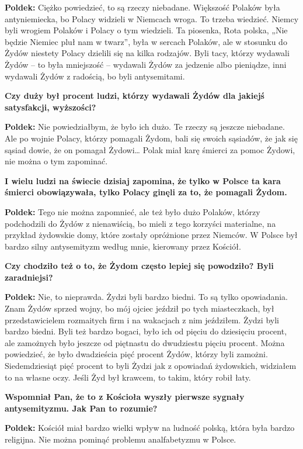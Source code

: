 \begin{otherlanguage}{polish}
\textbf{Poldek:}  Ciężko powiedzieć, to są rzeczy niebadane. Większość Polaków była antyniemiecka, bo Polacy widzieli w Niemcach wroga. To trzeba wiedzieć. Niemcy byli wrogiem Polaków i Polacy o tym wiedzieli. Ta piosenka, Rota polska, „Nie będzie Niemiec pluł nam w twarz”, była w sercach Polaków, ale w stosunku do Żydów niestety Polacy dzielili się na kilka rodzajów. Byli tacy, którzy wydawali Żydów – to była mniejszość – wydawali Żydów za jedzenie albo pieniądze, inni wydawali Żydów z radością, bo byli antysemitami.

\textbf{Czy duży był procent ludzi, którzy wydawali Żydów dla jakiejś satysfakcji, wyższości?}
 
\textbf{Poldek:} Nie powiedziałbym, że było ich dużo. Te rzeczy są jeszcze niebadane. Ale po wojnie Polacy, którzy pomagali Żydom, bali się swoich sąsiadów, że jak się sąsiad dowie, że on pomagał Żydowi… Polak miał karę śmierci za pomoc Żydowi, nie można o tym zapominać.

\textbf{I wielu ludzi na świecie dzisiaj zapomina, że tylko w Polsce ta kara śmierci obowiązywała, tylko Polacy ginęli za to, że pomagali Żydom.}

\textbf{Poldek:} Tego nie można zapomnieć, ale też było dużo Polaków, którzy podchodzili do Żydów z nienawiścią, bo mieli z tego korzyści materialne, na przykład żydowskie domy, które zostały opróżnione przez Niemców. W Polsce był bardzo silny antysemityzm według mnie, kierowany przez Kościół.
   
\textbf{Czy chodziło też o to, że Żydom często lepiej się powodziło? Byli zaradniejsi?}

\textbf{Poldek:} Nie, to nieprawda. Żydzi byli bardzo biedni. To są tylko opowiadania. Znam Żydów sprzed wojny, bo mój ojciec jeździł po tych miasteczkach, był przedstawicielem rozmaitych firm i na wakacjach z nim jeździłem. Żydzi byli bardzo biedni. Byli też bardzo bogaci, było ich od pięciu do dziesięciu procent, ale zamożnych było jeszcze od piętnastu do dwudziestu pięciu procent. Można powiedzieć, że było dwadzieścia pięć procent Żydów, którzy byli zamożni. Siedemdziesiąt pięć procent to byli Żydzi jak z opowiadań żydowskich, widziałem to na własne oczy. Jeśli Żyd był krawcem, to takim, który robił łaty.

\textbf{Wspomniał Pan, że to z Kościoła wyszły pierwsze sygnały antysemityzmu. Jak Pan to rozumie?}

\textbf{Poldek:} Kościół miał bardzo wielki wpływ na ludność polską, która była bardzo religijna. Nie można pominąć problemu analfabetyzmu w Polsce.


\end{otherlanguage}
